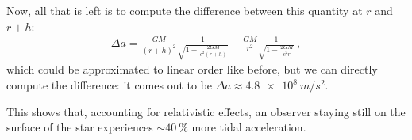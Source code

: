 \documentclass[main.tex]{subfiles}
\begin{document}
Now, all that is left is to compute the difference between this quantity at \(r\) and \(r + h\): 
%
\begin{align}
\Delta a = 
\frac{GM}{(r + h)^2} \frac{1}{\sqrt{1- \frac{2GM}{c^2(r+h)}}}
- 
\frac{GM}{r^2} \frac{1}{\sqrt{1- \frac{2GM}{c^2r}}}
\,,
\end{align}
%
which could be approximated to linear order like before, 
but we can directly compute the difference: 
it comes out to be \(\Delta a \approx \SI{4.8e8}{m / s^2}\). 

This shows that, accounting for relativistic effects, 
an observer staying still on the surface of the star experiences \(\sim \SI{40}{\percent}\) more tidal acceleration.
\end{document}
